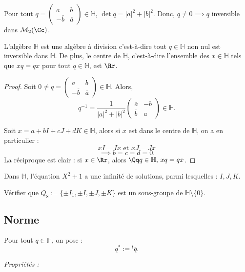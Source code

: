 \documentclass[class=report,crop=false]{standalone}
\newcommand{\Hh}{\mathbb{H}}
\begin{document}
\begin{remarque*}
Pour tout $q = \left(\begin{array}{cc}
a & b\\
-\overline{b} & \overline{a}
\end{array}\right) \in \Hh$, $\det q = |a|^2+|b|^2$. Donc, $q \neq 0 \implies q$ inversible dans $\mathcal{M}_2(\Cc)$.
\end{remarque*}

\begin{proposition}
L'algèbre $\Hh$ est une algèbre à division c'est-à-dire tout $q \in \Hh$ non nul est inversible dans $\Hh$. De plus, le centre de $\Hh$, c'est-à-dire l'ensemble des $x \in \Hh$ tels que  $xq=qx$ pour tout $q \in \Hh$, est $\Rr$.
\end{proposition}

\begin{proof}
Soit $0 \neq q =\left(\begin{array}{cc}
a & b\\
-\overline{b} & \overline{a}
\end{array}\right) \in \Hh$. Alors, \[q^{-1} = \frac{1}{|a|^2 + |b|^2}\left(\begin{array}{cc}
\overline{a} & -b\\
\overline{b} & {a}
\end{array}\right) \in \Hh.\]  

Soit $x = a + bI+cJ+dK \in \Hh$, alors si $x$ est dans le centre de $\Hh$, on a en particulier :
\[xI = Ix \text{ et } xJ =Jx\]
\[\implies b=c=d =0 .\]
La réciproque est clair : si $x \in \Rr$, alors $\Qq q \in \Hh,\, xq=qx$.
\end{proof}

\begin{remarque*}
Dans $\Hh$, l'équation $X^2 +1$ a une infinité de solutions, parmi lesquelles : $I,J,K$.
\end{remarque*}

\begin{exercicecours}
Vérifier que $Q_8 := \{\pm I_1,\pm I,\pm J,\pm K\}$ est un sous-groupe de $\Hh \setminus\{0\}$.
\end{exercicecours}

\subsection{Norme}

Pour tout $q \in \Hh$, on pose :
\[q^* := {}^t\!\overline{q} .\]

{\it Propriétés :}
\end{document}
